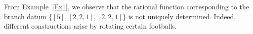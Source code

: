\documentclass[microtype]{gtpart}     %
\theoremstyle{definition}
\newtheorem{ex}{Example}[section]
\begin{document}
From Example~\ref{Ex1}, we observe that the rational function corresponding to the branch datum $\{[5], [2,2,1], [2,2,1]\}$ is not uniquely determined. Indeed, different constructions arise by rotating certain footballs.







\end{document}
